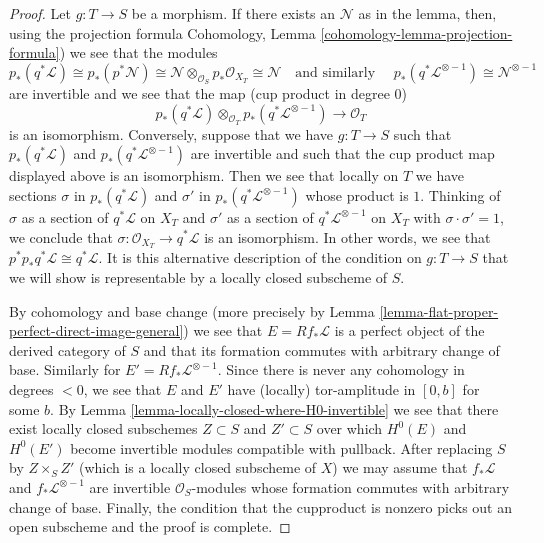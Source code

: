 \begin{proof}
Let $g : T \to S$ be a morphism. If there exists an $\mathcal{N}$
as in the lemma, then, using the projection formula
Cohomology, Lemma \ref{cohomology-lemma-projection-formula})
we see that the modules
$$
p_*(q^*\mathcal{L}) \cong
p_*(p^*\mathcal{N}) \cong
\mathcal{N} \otimes_{\mathcal{O}_S} p_*\mathcal{O}_{X_T} \cong
\mathcal{N}\quad\text{and similarly }\quad
p_*(q^*\mathcal{L}^{\otimes -1}) \cong \mathcal{N}^{\otimes -1}
$$
are invertible and we see that the map (cup product in degree $0$)
$$
p_*(q^*\mathcal{L})
\otimes_{\mathcal{O}_T}
p_*(q^*\mathcal{L}^{\otimes -1})
\longrightarrow \mathcal{O}_T
$$
is an isomorphism. Conversely, suppose that we have $g : T \to S$
such that $p_*(q^*\mathcal{L})$ and $p_*(q^*\mathcal{L}^{\otimes -1})$
are invertible and such that the cup product map displayed above is
an isomorphism. Then we see that locally on $T$ we have sections
$\sigma$ in $p_*(q^*\mathcal{L})$ and $\sigma'$ in
$p_*(q^*\mathcal{L}^{\otimes -1})$ whose product is $1$.
Thinking of $\sigma$ as a section of $q^*\mathcal{L}$ on $X_T$
and $\sigma'$ as a section of $q^*\mathcal{L}^{\otimes -1}$ on $X_T$
with $\sigma \cdot \sigma' = 1$, we conclude that
$\sigma : \mathcal{O}_{X_T} \to q^*\mathcal{L}$ is an isomorphism.
In other words, we see that $p^*p_*q^*\mathcal{L} \cong q^*\mathcal{L}$.
It is this alternative description of the condition on
$g : T \to S$ that we will show is representable by a
locally closed subscheme of $S$.

\medskip\noindent
By cohomology and base change (more precisely by
Lemma \ref{lemma-flat-proper-perfect-direct-image-general})
we see that $E = Rf_*\mathcal{L}$ is a perfect object of the
derived category of $S$ and that its formation commutes with
arbitrary change of base. Similarly for $E' = Rf_*\mathcal{L}^{\otimes -1}$.
Since there is never any cohomology in degrees $< 0$, we see that
$E$ and $E'$ have (locally) tor-amplitude in $[0, b]$ for some $b$.
By Lemma \ref{lemma-locally-closed-where-H0-invertible}
we see that there exist locally closed subschemes
$Z \subset S$ and $Z' \subset S$ over which $H^0(E)$
and $H^0(E')$ become invertible modules compatible with pullback.
After replacing $S$ by $Z \times_S Z'$ (which is a locally closed
subscheme of $X$) we may assume that $f_*\mathcal{L}$ and
$f_*\mathcal{L}^{\otimes -1}$ are invertible $\mathcal{O}_S$-modules
whose formation commutes with arbitrary change of base.
Finally, the condition that the cupproduct is nonzero picks
out an open subscheme and the proof is complete.
\end{proof}

